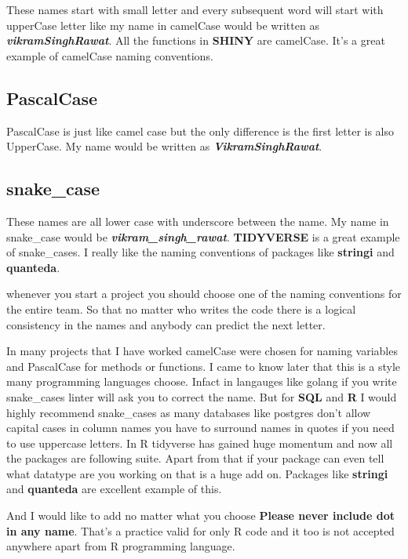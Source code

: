 \documentclass[
]{book}
\begin{document}
These names start with small letter and every subsequent word will start with upperCase letter like my name in camelCase would be written as \textbf{\emph{vikramSinghRawat}}. All the functions in \textbf{SHINY} are camelCase. It's a great example of camelCase naming conventions.

\hypertarget{pascalcase}{%
\subsection{PascalCase}\label{pascalcase}}

PascalCase is just like camel case but the only difference is the first letter is also UpperCase. My name would be written as \textbf{\emph{VikramSinghRawat}}.

\hypertarget{snake_case}{%
\subsection{snake\_case}\label{snake_case}}

These names are all lower case with underscore between the name. My name in snake\_case would be \textbf{\emph{vikram\_singh\_rawat}}. \textbf{TIDYVERSE} is a great example of snake\_cases. I really like the naming conventions of packages like \textbf{stringi} and \textbf{quanteda}.

whenever you start a project you should choose one of the naming conventions for the entire team. So that no matter who writes the code there is a logical consistency in the names and anybody can predict the next letter.

In many projects that I have worked camelCase were chosen for naming variables and PascalCase for methods or functions. I came to know later that this is a style many programming languages choose. Infact in langauges like golang if you write snake\_cases linter will ask you to correct the name. But for \textbf{SQL} and \textbf{R} I would highly recommend snake\_cases as many databases like postgres don't allow capital cases in column names you have to surround names in quotes if you need to use uppercase letters. In R tidyverse has gained huge momentum and now all the packages are following suite. Apart from that if your package can even tell what datatype are you working on that is a huge add on. Packages like \textbf{stringi} and \textbf{quanteda} are excellent example of this.

And I would like to add no matter what you choose \textbf{Please never include dot in any name}. That's a practice valid for only R code and it too is not accepted anywhere apart from R programming language.
\end{document}
